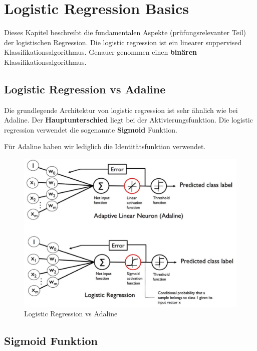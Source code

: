\newpage
\section{Logistic Regression Basics}
\label{sec:logistic_regression_basics}

Dieses Kapitel beschreibt die fundamentalen Aspekte (prüfungsrelevanter Teil) der logistischen Regression. Die logistic regression ist ein linearer suppervised Klassifikationsalgorithmus. Genauer genommen einen \textbf{binären} Klassifikationsalgorithmus. \\


\subsection{Logistic Regression vs Adaline}

Die grundlegende Architektur von logistic regression ist sehr ähnlich wie bei Adaline. Der \textbf{Hauptunterschied} liegt bei der Aktivierungsfunktion. Die logistic regression verwendet die sogenannte \textbf{Sigmoid} Funktion.

Für Adaline haben wir lediglich die Identitätsfunktion verwendet.


\begin{figure}[h!]
	\includegraphics[scale=0.5]{figures/logistic_regression_vs_adaline}
	\caption{Logistic Regression vs Adaline}
	\label{fig:lr_vs_adaline}
\end{figure}


\newpage
\subsection{Sigmoid Funktion}

